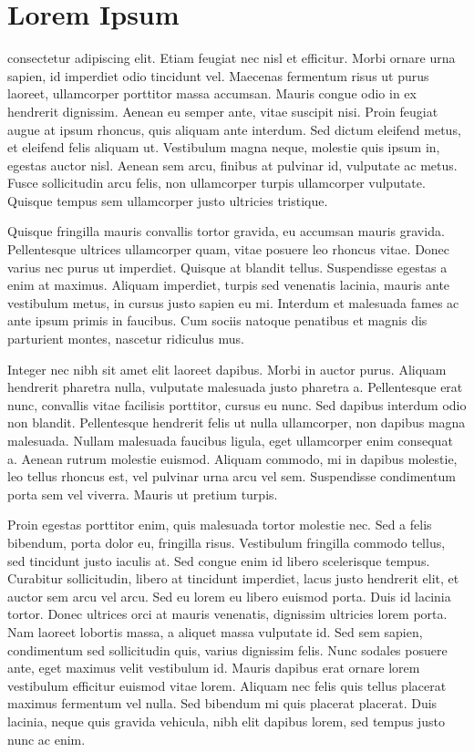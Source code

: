 \section{Lorem Ipsum}

consectetur adipiscing elit. Etiam feugiat nec nisl et efficitur. Morbi ornare urna sapien, id imperdiet odio tincidunt vel. Maecenas fermentum risus ut purus laoreet, ullamcorper porttitor massa accumsan. Mauris congue odio in ex hendrerit dignissim. Aenean eu semper ante, vitae suscipit nisi. Proin feugiat augue at ipsum rhoncus, quis aliquam ante interdum. Sed dictum eleifend metus, et eleifend felis aliquam ut. Vestibulum magna neque, molestie quis ipsum in, egestas auctor nisl. Aenean sem arcu, finibus at pulvinar id, vulputate ac metus. Fusce sollicitudin arcu felis, non ullamcorper turpis ullamcorper vulputate. Quisque tempus sem ullamcorper justo ultricies tristique.

Quisque fringilla mauris convallis tortor gravida, eu accumsan mauris gravida. Pellentesque ultrices ullamcorper quam, vitae posuere leo rhoncus vitae. Donec varius nec purus ut imperdiet. Quisque at blandit tellus. Suspendisse egestas a enim at maximus. Aliquam imperdiet, turpis sed venenatis lacinia, mauris ante vestibulum metus, in cursus justo sapien eu mi. Interdum et malesuada fames ac ante ipsum primis in faucibus. Cum sociis natoque penatibus et magnis dis parturient montes, nascetur ridiculus mus.

Integer nec nibh sit amet elit laoreet dapibus. Morbi in auctor purus. Aliquam hendrerit pharetra nulla, vulputate malesuada justo pharetra a. Pellentesque erat nunc, convallis vitae facilisis porttitor, cursus eu nunc. Sed dapibus interdum odio non blandit. Pellentesque hendrerit felis ut nulla ullamcorper, non dapibus magna malesuada. Nullam malesuada faucibus ligula, eget ullamcorper enim consequat a. Aenean rutrum molestie euismod. Aliquam commodo, mi in dapibus molestie, leo tellus rhoncus est, vel pulvinar urna arcu vel sem. Suspendisse condimentum porta sem vel viverra. Mauris ut pretium turpis.

Proin egestas porttitor enim, quis malesuada tortor molestie nec. Sed a felis bibendum, porta dolor eu, fringilla risus. Vestibulum fringilla commodo tellus, sed tincidunt justo iaculis at. Sed congue enim id libero scelerisque tempus. Curabitur sollicitudin, libero at tincidunt imperdiet, lacus justo hendrerit elit, et auctor sem arcu vel arcu. Sed eu lorem eu libero euismod porta. Duis id lacinia tortor. Donec ultrices orci at mauris venenatis, dignissim ultricies lorem porta. Nam laoreet lobortis massa, a aliquet massa vulputate id. Sed sem sapien, condimentum sed sollicitudin quis, varius dignissim felis. Nunc sodales posuere ante, eget maximus velit vestibulum id. Mauris dapibus erat ornare lorem vestibulum efficitur euismod vitae lorem. Aliquam nec felis quis tellus placerat maximus fermentum vel nulla. Sed bibendum mi quis placerat placerat. Duis lacinia, neque quis gravida vehicula, nibh elit dapibus lorem, sed tempus justo nunc ac enim.

